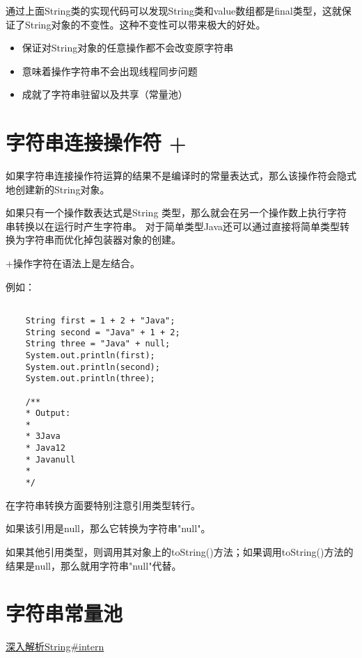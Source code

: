 通过上面String类的实现代码可以发现String类和value数组都是final类型，这就保证了String对象的不变性。这种不变性可以带来极大的好处。

\begin{itemize}
    \item 保证对String对象的任意操作都不会改变原字符串
    \item 意味着操作字符串不会出现线程同步问题
    \item 成就了字符串驻留以及共享（常量池）
\end{itemize}



\section{字符串连接操作符 + }


如果字符串连接操作符运算的结果不是编译时的常量表达式，那么该操作符会隐式地创建新的String对象。


如果只有一个操作数表达式是String 类型，那么就会在另一个操作数上执行字符串转换以在运行时产生字符串。 
对于简单类型Java还可以通过直接将简单类型转换为字符串而优化掉包装器对象的创建。

\textcolor{codepurple}{+}操作字符在语法上是左结合。

例如：

\begin{lstlisting}[style=cjava]

    String first = 1 + 2 + "Java";
    String second = "Java" + 1 + 2;
    String three = "Java" + null;
    System.out.println(first);
    System.out.println(second);
    System.out.println(three);

    /** 
    * Output: 
    * 
    * 3Java
    * Java12
    * Javanull
    * 
    */

\end{lstlisting}


在字符串转换方面要特别注意引用类型转行。

如果该引用是null，那么它转换为字符串"null"。

如果其他引用类型，则调用其对象上的toString()方法；如果调用toString()方法的结果是null，那么就用字符串"null"代替。


\section{字符串常量池}

\href{https://tech.meituan.com/2014/03/06/in-depth-understanding-string-intern.html}{深入解析String\#intern}



